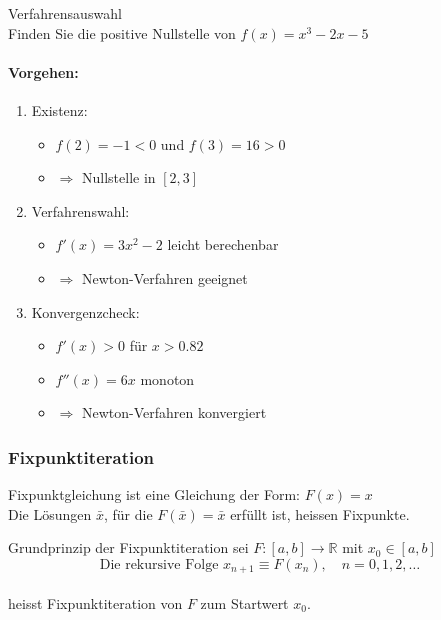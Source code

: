\begin{example2}{Verfahrensauswahl}\\
Finden Sie die positive Nullstelle von $f(x) = x^3 - 2x - 5$

\paragraph{Vorgehen:}
\begin{enumerate}
    \item Existenz:
    \begin{itemize}
        \item $f(2) = -1 < 0$ und $f(3) = 16 > 0$
        \item $\Rightarrow$ Nullstelle in $[2,3]$
    \end{itemize}
    
    \item Verfahrenswahl:
    \begin{itemize}
        \item $f'(x) = 3x^2 - 2$ leicht berechenbar
        \item $\Rightarrow$ Newton-Verfahren geeignet
    \end{itemize}
    
    \item Konvergenzcheck:
    \begin{itemize}
        \item $f'(x) > 0$ für $x > 0.82$
        \item $f''(x) = 6x$ monoton
        \item $\Rightarrow$ Newton-Verfahren konvergiert
    \end{itemize}
\end{enumerate}
\end{example2}






\subsubsection{Fixpunktiteration}

\begin{definition}{Fixpunktgleichung}
ist eine Gleichung der Form: $F(x)=x$\\
Die Lösungen $\bar{x}$, für die $F(\bar{x})=\bar{x}$ erfüllt ist, heissen Fixpunkte.
\end{definition}

\begin{concept}{Grundprinzip der Fixpunktiteration}
sei $F:[a,b] \rightarrow \mathbb{R}$ mit $x_0 \in [a,b]$ 
\vspace{-6mm}\\
$$\text{Die rekursive Folge }x_{n+1} \equiv F(x_n), \quad n=0,1,2,\ldots$$
\vspace{-4mm}\\
heisst Fixpunktiteration von $F$ zum Startwert $x_0$.
\end{concept}



